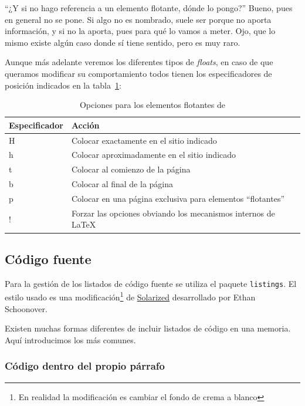 \documentclass[%
    school=etsisi,%
    type=pfg,%
    degree=61CD,%
]{upm-report}
\begin{document}
\enquote{¿Y si no hago referencia a un elemento flotante, dónde lo pongo?} Bueno, pues en general no se pone. Si algo no es nombrado, suele ser porque no aporta información, y si no la aporta, pues para qué lo vamos a meter. Ojo, que lo mismo existe algún caso donde sí tiene sentido, pero es muy raro.

Aunque más adelante veremos los diferentes tipos de \textit{floats}, en caso de que queramos modificar su comportamiento todos tienen los especificadores de posición indicados en la tabla~\ref{tab:floats-options}:

\begin{table}
    \caption{\label{tab:floats-options}Opciones para los elementos flotantes de }
    \centering
    \begin{tabularx}{\textwidth}{@{}lX@{}}
        \toprule
        \textbf{Especificador} & \textbf{Acción} \\
        \midrule
        H & Colocar exactamente en el sitio indicado                       \\
        h & Colocar aproximadamente en el sitio indicado                   \\
        t & Colocar al comienzo de la página                               \\
        b & Colocar al final de la página                                  \\
        p & Colocar en una página exclusiva para elementos ``flotantes''   \\
        ! & Forzar las opciones obviando los mecanismos internos de \LaTeX \\
    \bottomrule
    \end{tabularx}
\end{table}

\subsection{Código fuente}

Para la gestión de los listados de código fuente se utiliza el paquete \texttt{listings}. El estilo usado es una modificación\footnote{En realidad la modificación es cambiar el fondo de crema a blanco} de \href{https://ethanschoonover.com/solarized/}{Solarized} desarrollado por Ethan Schoonover.

Existen muchas formas diferentes de incluir listados de código en una memoria. Aquí introducimos los más comunes.

\subsubsection{Código dentro del propio párrafo}
\end{document}
